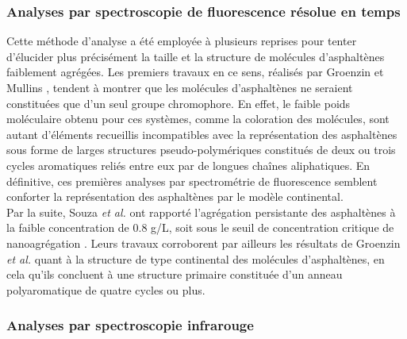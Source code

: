 \documentclass[12pt,a4paper]{book}
\begin{document}
\subsubsection{Analyses par spectroscopie de fluorescence résolue en temps} 

Cette méthode d'analyse a été employée à plusieurs reprises pour tenter d'élucider plus précisément la taille et la structure de molécules d'asphaltènes faiblement agrégées.  
Les premiers travaux en ce sens, réalisés par Groenzin et Mullins  \cite{groenzin1999asphaltene}, tendent à montrer que les molécules d'asphaltènes ne seraient constituées que d'un seul groupe chromophore. En effet, le faible poids moléculaire obtenu pour ces systèmes, comme la coloration des molécules, sont autant d'éléments recueillis incompatibles avec la représentation des asphaltènes sous forme de larges structures pseudo-polymériques constitués de deux ou trois cycles aromatiques reliés entre eux par de longues chaînes aliphatiques. En définitive, ces premières analyses par spectrométrie de fluorescence semblent conforter la représentation des asphaltènes par le modèle continental. \\
Par la suite, Souza \textit{et al.} ont rapporté l'agrégation persistante des asphaltènes à la faible concentration de 0.8 g/L, soit sous le seuil de concentration critique de nanoagrégation \cite{souza2009study}. Leurs travaux corroborent par ailleurs les résultats de Groenzin \textit{et al.}\cite{groenzin1999asphaltene} quant à la structure de type \og continental \fg{} des molécules d'asphaltènes, en cela qu'ils concluent à une structure primaire constituée d'un anneau polyaromatique de quatre cycles ou plus. 




\subsubsection{Analyses par spectroscopie infrarouge}
\end{document}
